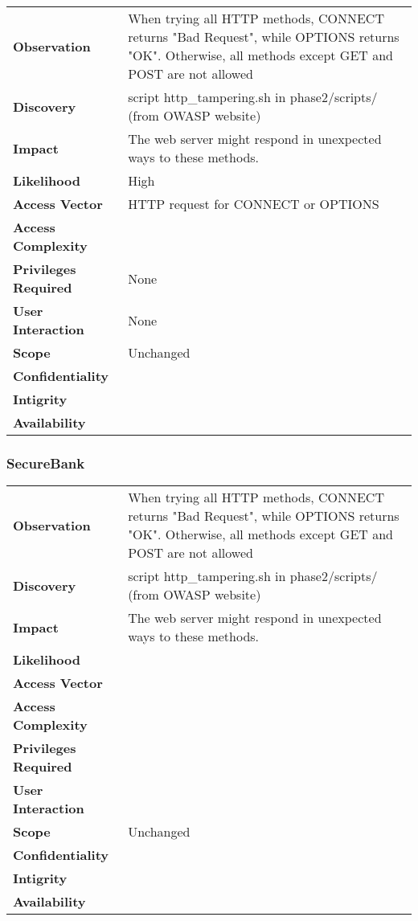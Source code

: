 \begin{tabular}{l|p{10cm}}
\textbf{Observation} & When trying all HTTP methods, CONNECT returns "Bad Request", while OPTIONS returns "OK". Otherwise, all methods except GET and POST are not allowed\\
\textbf{Discovery} & script http\_tampering.sh in phase2/scripts/ (from OWASP website) \\
\textbf{Impact} & The web server might respond in unexpected ways to these methods. \\
\textbf{Likelihood} & High \\
\textbf{Access Vector} & HTTP request for CONNECT or OPTIONS\\
\textbf{Access Complexity} & \\
\textbf{Privileges Required} & None \\
\textbf{User Interaction} & None \\
\textbf{Scope} & Unchanged \\
\textbf{Confidentiality} & \\
\textbf{Intigrity} & \\
\textbf{Availability} & \\
\end{tabular}

\subsubsection*{SecureBank}

\begin{tabular}{l|p{10cm}}
\textbf{Observation} & When trying all HTTP methods, CONNECT returns "Bad Request", while OPTIONS returns "OK". Otherwise, all methods except GET and POST are not allowed\\
\textbf{Discovery} & script http\_tampering.sh in phase2/scripts/ (from OWASP website)\\
\textbf{Impact} & The web server might respond in unexpected ways to these methods.\\
\textbf{Likelihood} & \\
\textbf{Access Vector} & \\
\textbf{Access Complexity} & \\
\textbf{Privileges Required} & \\
\textbf{User Interaction} & \\
\textbf{Scope} & Unchanged \\
\textbf{Confidentiality} & \\
\textbf{Intigrity} & \\
\textbf{Availability} & \\
\end{tabular}


